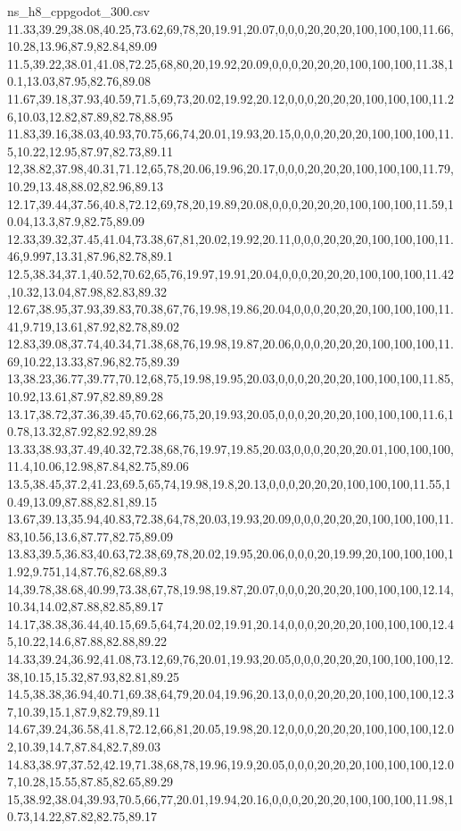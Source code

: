 \begin{filecontents*}[overwrite]{ns_h8_cppgodot_300.csv}
11.33,39.29,38.08,40.25,73.62,69,78,20,19.91,20.07,0,0,0,20,20,20,100,100,100,11.66,10.28,13.96,87.9,82.84,89.09
11.5,39.22,38.01,41.08,72.25,68,80,20,19.92,20.09,0,0,0,20,20,20,100,100,100,11.38,10.1,13.03,87.95,82.76,89.08
11.67,39.18,37.93,40.59,71.5,69,73,20.02,19.92,20.12,0,0,0,20,20,20,100,100,100,11.26,10.03,12.82,87.89,82.78,88.95
11.83,39.16,38.03,40.93,70.75,66,74,20.01,19.93,20.15,0,0,0,20,20,20,100,100,100,11.5,10.22,12.95,87.97,82.73,89.11
12,38.82,37.98,40.31,71.12,65,78,20.06,19.96,20.17,0,0,0,20,20,20,100,100,100,11.79,10.29,13.48,88.02,82.96,89.13
12.17,39.44,37.56,40.8,72.12,69,78,20,19.89,20.08,0,0,0,20,20,20,100,100,100,11.59,10.04,13.3,87.9,82.75,89.09
12.33,39.32,37.45,41.04,73.38,67,81,20.02,19.92,20.11,0,0,0,20,20,20,100,100,100,11.46,9.997,13.31,87.96,82.78,89.1
12.5,38.34,37.1,40.52,70.62,65,76,19.97,19.91,20.04,0,0,0,20,20,20,100,100,100,11.42,10.32,13.04,87.98,82.83,89.32
12.67,38.95,37.93,39.83,70.38,67,76,19.98,19.86,20.04,0,0,0,20,20,20,100,100,100,11.41,9.719,13.61,87.92,82.78,89.02
12.83,39.08,37.74,40.34,71.38,68,76,19.98,19.87,20.06,0,0,0,20,20,20,100,100,100,11.69,10.22,13.33,87.96,82.75,89.39
13,38.23,36.77,39.77,70.12,68,75,19.98,19.95,20.03,0,0,0,20,20,20,100,100,100,11.85,10.92,13.61,87.97,82.89,89.28
13.17,38.72,37.36,39.45,70.62,66,75,20,19.93,20.05,0,0,0,20,20,20,100,100,100,11.6,10.78,13.32,87.92,82.92,89.28
13.33,38.93,37.49,40.32,72.38,68,76,19.97,19.85,20.03,0,0,0,20,20,20.01,100,100,100,11.4,10.06,12.98,87.84,82.75,89.06
13.5,38.45,37.2,41.23,69.5,65,74,19.98,19.8,20.13,0,0,0,20,20,20,100,100,100,11.55,10.49,13.09,87.88,82.81,89.15
13.67,39.13,35.94,40.83,72.38,64,78,20.03,19.93,20.09,0,0,0,20,20,20,100,100,100,11.83,10.56,13.6,87.77,82.75,89.09
13.83,39.5,36.83,40.63,72.38,69,78,20.02,19.95,20.06,0,0,0,20,19.99,20,100,100,100,11.92,9.751,14,87.76,82.68,89.3
14,39.78,38.68,40.99,73.38,67,78,19.98,19.87,20.07,0,0,0,20,20,20,100,100,100,12.14,10.34,14.02,87.88,82.85,89.17
14.17,38.38,36.44,40.15,69.5,64,74,20.02,19.91,20.14,0,0,0,20,20,20,100,100,100,12.45,10.22,14.6,87.88,82.88,89.22
14.33,39.24,36.92,41.08,73.12,69,76,20.01,19.93,20.05,0,0,0,20,20,20,100,100,100,12.38,10.15,15.32,87.93,82.81,89.25
14.5,38.38,36.94,40.71,69.38,64,79,20.04,19.96,20.13,0,0,0,20,20,20,100,100,100,12.37,10.39,15.1,87.9,82.79,89.11
14.67,39.24,36.58,41.8,72.12,66,81,20.05,19.98,20.12,0,0,0,20,20,20,100,100,100,12.02,10.39,14.7,87.84,82.7,89.03
14.83,38.97,37.52,42.19,71.38,68,78,19.96,19.9,20.05,0,0,0,20,20,20,100,100,100,12.07,10.28,15.55,87.85,82.65,89.29
15,38.92,38.04,39.93,70.5,66,77,20.01,19.94,20.16,0,0,0,20,20,20,100,100,100,11.98,10.73,14.22,87.82,82.75,89.17

\end{filecontents*}
